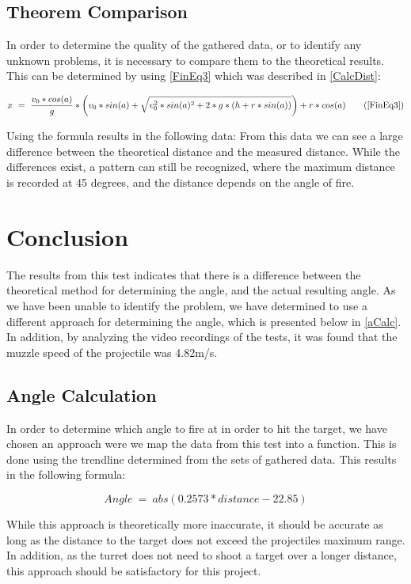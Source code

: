 \subsection{Theorem Comparison}
In order to
determine the quality of the gathered data, or to identify any unknown
problems, it is necessary to compare them to the theoretical results. This can
be determined by using \autoref{FinEq3} which was described in \autoref{CalcDist}:

\begin{equation*}
x\ =\ \frac{v_0*cos(a)}{g}* \left(
v_0*sin(a)+\sqrt{v_0^2*sin(a)^2+2*g*(h+r*sin(a))}\right)+r*cos(a)
\tag{\ref*{FinEq3}}
\end{equation*}

Using the formula results in the following data:
From this data we can see a large difference between the theoretical distance
and the measured distance. While the differences exist, a pattern can still be
recognized, where the maximum distance is recorded at 45 degrees, and the
distance depends on the angle of fire. 

\section{Conclusion}
The results from this test indicates that there is a difference between the
theoretical method for determining the angle, and the actual resulting angle. As
we have been unable to identify the problem, we have determined to use a
different approach for determining the angle, which is presented below in
\autoref{aCalc}. In addition, by analyzing the video recordings of the tests, it
was found that the muzzle speed of the projectile was 4.82m/s.

\subsection{Angle Calculation}\label{aCalc}
In order to determine which angle to fire at in order to hit the target, we have
chosen an approach were we map the data from this test into a function. This is
done using the trendline determined from the sets of gathered data. This results
in the following formula:

\begin{equation}\label{angleCalc}
Angle\ =\ abs(0.2573 * distance - 22.85)
\end{equation} 

While this approach is theoretically more inaccurate, it should be
accurate as long as the distance to the target does not exceed the projectiles
maximum range. In addition, as the turret does not need to shoot a target over a
longer distance, this approach should be satisfactory for this project.
